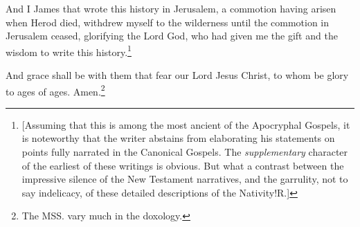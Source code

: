 \pend\pstart
{}

\pend\pstart
And I James that wrote this history in Jerusalem, a commotion having arisen when Herod died, withdrew myself to the wilderness until the commotion in Jerusalem ceased, glorifying the Lord God, who had given me the gift and the wisdom to write this history.\footnote{[Assuming that this is among the most ancient of the Apocryphal Gospels, it is noteworthy that the writer abstains from elaborating his statements on points fully narrated in the Canonical Gospels. The \textit{supplementary} character of the earliest of these writings is obvious. But what a contrast between the impressive silence of the New Testament narratives, and the garrulity, not to say indelicacy, of these detailed descriptions of the Nativity!\textemdash R.]}

\pend\pstart
And grace shall be with them that fear our Lord Jesus Christ, to whom be glory to ages of ages. Amen.\footnote{The MSS. vary much in the doxology.}

\pend
